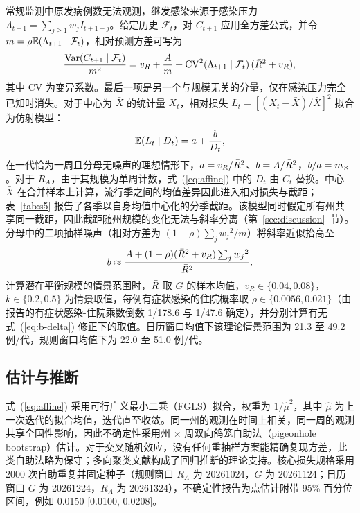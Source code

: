 常规监测中原发病例数无法观测，继发感染来源于感染压力 $\Lambda_{t+1}=\sum_{j\ge1}w_jI_{t+1-j}$\citep{fraser2007estimating, cori2013new}。给定历史 $\mathcal{F}_t$，对 $C_{t+1}$ 应用全方差公式，并令 $m=\rho\mathbb{E}(\Lambda_{t+1}\mid\mathcal{F}_t)$，相对预测方差可写为
\begin{equation}
  \frac{\mathrm{Var}(C_{t+1}\mid\mathcal{F}_t)}{m^2}=v_R+\frac{A}{m}+\mathrm{CV}^2(\Lambda_{t+1}\mid\mathcal{F}_t)\,(\bar{R}^2+v_R),
  \label{eq:info-decomp}
\end{equation}
其中 $\mathrm{CV}$ 为变异系数。最后一项是另一个与规模无关的分量，仅在感染压力完全已知时消失。对于中心为 $\bar{X}$ 的统计量 $X_t$，相对损失 $L_t=[(X_t-\bar{X})/\bar{X}]^2$ 拟合为仿射模型：
\begin{equation}
  \mathbb{E}(L_t\mid D_t)=a+\frac{b}{D_t},
  \label{eq:affine}
\end{equation}
在一代恰为一周且分母无噪声的理想情形下，$a=v_R/\bar{R}^2$、$b=A/\bar{R}^2$，$b/a=m_{\times}$。对于 $R_A$，由于其规模为单周计数，式~(\ref{eq:affine}) 中的 $D_t$ 由 $C_t$ 替换。中心 $\bar{X}$ 在合并样本上计算，流行季之间的均值差异因此进入相对损失与截距；表~\ref{tab:s5} 报告了各季以自身均值中心化的分季截距。该模型同时假定所有州共享同一截距，因此截距随州规模的变化无法与斜率分离（第~\ref{sec:discussion}~节）。分母中的二项抽样噪声（相对方差为 $(1-\rho)\sum_jw_j{}^2/m$）将斜率近似抬高至
\begin{equation}
  b\approx\frac{A+(1-\rho)(\bar{R}^2+v_R)\sum_jw_j{}^2}{\bar{R}^2}.
  \label{eq:b-delta}
\end{equation}
计算潜在平衡规模的情景范围时，$\bar{R}$ 取 $G$ 的样本均值，$v_R\in\{0.04,0.08\}$，$k\in\{0.2,0.5\}$ 为情景取值\citep{lloydsmith2005superspreading}，每例有症状感染的住院概率取 $\rho\in\{0.0056,0.021\}$（由 \citet{tokars2018seasonal} 报告的有症状感染-住院乘数倒数 1/178.6 与 1/47.6 确定），并分别计算有无式~(\ref{eq:b-delta}) 修正下的取值。日历窗口均值下该理论情景范围为 21.3 至 49.2 例/代，规则窗口均值下为 22.0 至 51.0 例/代。

\subsection{估计与推断}
\label{sec:meth-inference}

式~(\ref{eq:affine}) 采用可行广义最小二乘（FGLS）拟合，权重为 $1/\hat{\mu}^2$，其中 $\hat{\mu}$ 为上一次迭代的拟合均值，迭代直至收敛\citep{wooldridge2010econometric}。同一州的观测在时间上相关，同一周的观测共享全国性影响，因此不确定性采用州 $\times$ 周双向鸽笼自助法（pigeonhole bootstrap）估计\citep{owen2007pigeonhole}。对于交叉随机效应，没有任何重抽样方案能精确复现方差，此类自助法略为保守\citep{mccullagh2000resampling, owen2007pigeonhole}；多向聚类文献构成了回归推断的理论支持\citep{cameron2008bootstrap, cameron2011robust}。核心损失规格采用 2000 次自助重复并固定种子（规则窗口 $R_A$ 为 20261024，$G$ 为 20261124；日历窗口 $G$ 为 20261224，$R_A$ 为 20261324），不确定性报告为点估计附带 95\% 百分位区间，例如 0.0150 [0.0100, 0.0208]。

